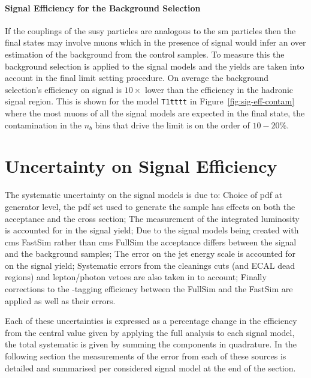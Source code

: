 \paragraph{Signal Efficiency for the Background Selection} %
\label{par:signal_efficiency_for_the_background_selection}
If the couplings of the \ac{susy} particles are analogous to the \ac{sm} 
particles then the final states may involve muons which in the presence of 
signal would infer an over estimation of the background from the control 
samples.
To measure this the background selection is applied to the signal models and 
the yields are taken into account in the final limit setting procedure. On 
average the background selection's efficiency on signal is $10\times$ lower 
than the efficiency in the hadronic signal region. This is shown for the model 
\texttt{T1tttt} in Figure~\ref{fig:sig-eff-contam} where the most muons of all 
the signal models are expected in the final state, the contamination in the 
$n_{b}$ bins that drive the limit is on the order of $10-20\%$.

\section{Uncertainty on Signal Efficiency} %
\label{sub:uncertainty_on_signal_efficiency}
The systematic uncertainty on the signal models is due to: Choice of \ac{pdf} 
at generator level, the \ac{pdf} set used to generate the sample has effects on 
both the acceptance and the cross section; The measurement of the integrated 
luminosity is accounted for in the signal yield; Due to the signal models being 
created with \ac{cms} FastSim\cite{} rather than \ac{cms} FullSim\cite{} the 
acceptance differs between the signal and the background samples; The error on 
the jet energy scale is accounted for on the signal yield; Systematic errors 
from the cleanings cuts (\Rmiss and ECAL dead regions) and lepton/photon vetoes 
are also taken in to account; Finally corrections to the \Pbottom-tagging 
efficiency between the FullSim and the FastSim are applied as well as their 
errors.

Each of these uncertainties is expressed as a percentage change in the 
efficiency from the central value given by applying the full analysis to each 
signal model, the total systematic is given by summing the components in 
quadrature. In the following section the measurements of the error from each of 
these sources is detailed and summarised per considered signal model at the end 
of the section.

